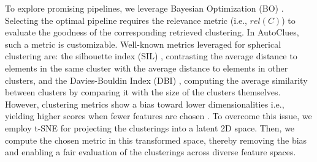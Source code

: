 To explore promising pipelines, we leverage Bayesian Optimization (BO) \cite{hutter2011sequential}.
Selecting the optimal pipeline requires the relevance metric (i.e., $rel(C)$) to evaluate the goodness of the corresponding retrieved clustering.
In AutoClues, such a metric is customizable.
Well-known metrics leveraged for spherical clustering are: the silhouette index (SIL) \cite{zhu2010clustering}, contrasting the average distance to elements in the same cluster with the average distance to elements in other clusters, and the Davies-Bouldin Index (DBI) \cite{dbi}, computing the average similarity between clusters by comparing it with the size of the clusters themselves.
%
However, clustering metrics show a bias toward lower dimensionalities i.e., yielding higher scores when fewer features are chosen \cite{lensen2017using,hancer2020new}.
To overcome this issue, we employ t-SNE \cite{van2008visualizing} for projecting the clusterings into a latent 2D space.
Then, we compute the chosen metric in this transformed space, thereby removing the bias and enabling a fair evaluation of the clusterings across diverse feature spaces.



